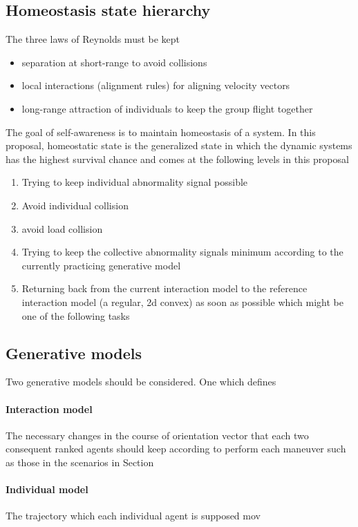 \documentclass{article}
\begin{document}
		\subsection{Homeostasis state hierarchy} \label{sec:hierarchical-homeostatic-state} 
			The three laws of Reynolds must be kept \citep{reynolds-1987-flocks-herds-and-schools-a-distributed-behavioral-model}
			\begin{itemize}
				\item separation at short-range to avoid collisions
				\item local interactions (alignment rules) for aligning velocity vectors 
				\item long-range attraction of individuals to keep the group flight together
			\end{itemize}
			
			The goal of self-awareness is to maintain homeostasis of a system.
			In this proposal, homeostatic state is the generalized state in which the dynamic systems has the highest survival chance and comes at the following levels in this proposal
			\begin{enumerate}
				\item Trying to keep individual abnormality signal possible
				\item Avoid individual collision 
				\item avoid load collision
				\item Trying to keep the collective abnormality signals minimum according to the currently practicing generative model 
				\item Returning back from the current interaction model to the reference  interaction model (a regular, 2d convex) as soon as possible which might be one of the following tasks
			\end{enumerate}
	
		\subsection{Generative models}\label{sec:generative-collective-models}
			Two generative models should be considered. One which defines 
			\paragraph{Interaction model}
			The necessary changes in the course of orientation vector that each two consequent ranked agents should keep according to perform each maneuver such as those in the scenarios in Section 
			\paragraph{Individual model}
			The trajectory which each individual agent is supposed mov
				
\end{document}

